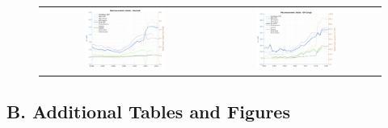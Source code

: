 \documentclass[a4paper]{article}
\begin{document}
\begin{figure}
\begin{tabular}{cc}
\includegraphics[width=0.5\textwidth, trim= {0 0 0 0}, clip]{"DataQuality_BDI.png"} & \includegraphics[width=0.5\textwidth, trim= {0 0 0 0}, clip]{"DataQuality_COD.png"} \\
\end{tabular}
\end{figure}
\FloatBarrier




\subsection*{B. Additional Tables and Figures}
\setcounter{table}{0}
\renewcommand{\thetable}{B\arabic{table}}
\setcounter{figure}{0}
\renewcommand{\thefigure}{B\arabic{figure}}
\end{document}
